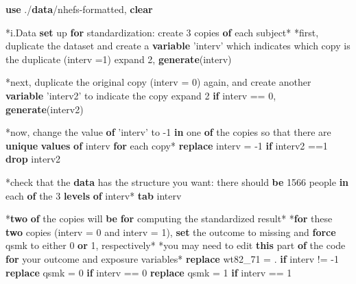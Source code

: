 \documentclass[
  10pt,
]{book}
\newenvironment{Shaded}{\begin{snugshade}}{\end{snugshade}}
\newcommand{\FunctionTok}[1]{\textcolor[rgb]{0.00,0.00,0.00}{#1}}
\newcommand{\KeywordTok}[1]{\textcolor[rgb]{0.13,0.29,0.53}{\textbf{#1}}}
\newcommand{\NormalTok}[1]{#1}
\newcommand{\OtherTok}[1]{\textcolor[rgb]{0.56,0.35,0.01}{#1}}
\begin{document}
\begin{Shaded}
\begin{Highlighting}[]
\KeywordTok{use}\NormalTok{ ./}\KeywordTok{data}\NormalTok{/nhefs-formatted, }\KeywordTok{clear}

\NormalTok{*i.Data }\KeywordTok{set}\NormalTok{ up }\KeywordTok{for}\NormalTok{ standardization: create 3 copies }\KeywordTok{of}\NormalTok{ each subject*}
\NormalTok{*first, duplicate the dataset and create a }\KeywordTok{variable}\NormalTok{ 'interv' which indicates which copy is the duplicate (interv =1)}
\NormalTok{expand 2, }\KeywordTok{generate}\NormalTok{(interv)}

\NormalTok{*next, duplicate the original copy (interv = 0) again, and create another }\KeywordTok{variable}\NormalTok{ 'interv2' to indicate the copy}
\NormalTok{expand 2 }\KeywordTok{if}\NormalTok{ interv == 0, }\KeywordTok{generate}\NormalTok{(interv2)}

\NormalTok{*now, change the }\OtherTok{value} \KeywordTok{of}\NormalTok{ 'interv' to -1 }\KeywordTok{in}\NormalTok{ one }\KeywordTok{of}\NormalTok{ the copies so that there are }\KeywordTok{unique} \KeywordTok{values} \KeywordTok{of}\NormalTok{ interv }\KeywordTok{for}\NormalTok{ each copy*}
\KeywordTok{replace}\NormalTok{ interv = -1  }\KeywordTok{if}\NormalTok{ interv2 ==1}
\KeywordTok{drop}\NormalTok{ interv2 }

\NormalTok{*check that the }\KeywordTok{data}\NormalTok{ has the structure you want: there should }\KeywordTok{be}\NormalTok{ 1566 people }\KeywordTok{in}\NormalTok{ each }\KeywordTok{of}\NormalTok{ the 3 }\KeywordTok{levels} \KeywordTok{of}\NormalTok{ interv*}
\KeywordTok{tab}\NormalTok{ interv}

\NormalTok{*}\KeywordTok{two} \KeywordTok{of}\NormalTok{ the copies will }\KeywordTok{be} \KeywordTok{for}\NormalTok{ computing the standardized result*}
\NormalTok{*}\KeywordTok{for}\NormalTok{ these }\KeywordTok{two}\NormalTok{ copies (interv = 0 and interv = 1), }\KeywordTok{set}\NormalTok{ the outcome to }\FunctionTok{missing}\NormalTok{ and }\KeywordTok{force}\NormalTok{ qsmk to either 0 }\KeywordTok{or}\NormalTok{ 1, respectively*}
\NormalTok{*you may need to edit }\KeywordTok{this}\NormalTok{ part }\KeywordTok{of}\NormalTok{ the code }\KeywordTok{for}\NormalTok{ your outcome and exposure variables*}
\KeywordTok{replace}\NormalTok{ wt82_71 = . }\KeywordTok{if}\NormalTok{ interv != -1}
\KeywordTok{replace}\NormalTok{ qsmk = 0 }\KeywordTok{if}\NormalTok{ interv == 0}
\KeywordTok{replace}\NormalTok{ qsmk = 1 }\KeywordTok{if}\NormalTok{ interv == 1}


\end{Highlighting}
\end{Shaded}
\end{document}

